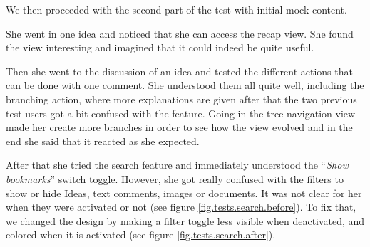 \documentclass[a4paper,12pt, oneside]{article}
\begin{document}
We then proceeded with the second part of the test with initial mock content.

She went in one idea and noticed that she can access the recap view.
She found the view interesting and imagined that it could indeed be quite useful.

Then she went to the discussion of an idea and tested the different actions that can be done with one comment.
She understood them all quite well, including the branching action, where more explanations are given after that the two previous test users got a bit confused with the feature.
Going in the tree navigation view made her create more branches in order to see how the view evolved and in the end she said that it reacted as she expected.

After that she tried the search feature and immediately understood the “\emph{Show bookmarks}” switch toggle.
However, she got really confused with the filters to show or hide Ideas, text comments, images or documents.
It was not clear for her when they were activated or not (see figure \ref{fig.tests.search.before}).
To fix that, we changed the design by making a filter toggle less visible when deactivated, and colored when it is activated (see figure \ref{fig.tests.search.after}).
\end{document}
